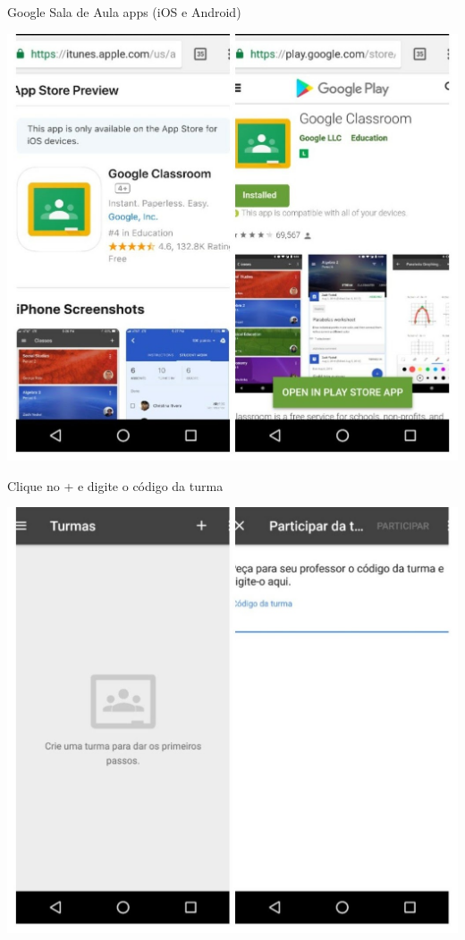 \documentclass{beamer}
\begin{document}
\begin{frame}{Google Sala de Aula apps (iOS e Android)}
  \begin{center}
    \includegraphics[height=\textheight]{Intro/gclassroom-apps}
  \end{center}
\end{frame}

\begin{frame}{Clique no + e digite o código da turma}
  \begin{center}
    \includegraphics[height=\textheight]{Intro/gclassroom-turma}
  \end{center}
\end{frame}
\end{document}
